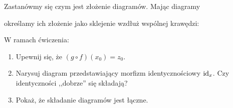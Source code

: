 \begin{exc}
{  Zastanówmy się czym jest złożenie diagramów. Mając diagramy
  \begin{center}
  \end{center}
  określamy ich złożenie jako sklejenie wzdłuż wspólnej krawędzi:
  \begin{center}
  \end{center}
  W ramach ćwiczenia:
  \begin{enumerate}
    \item Upewnij się, że $(g\circ f)(x_0) = z_0$.
    \item Narysuj diagram przedstawiający morfizm identycznościowy $\mathrm{id}_{x}$. Czy identyczności ,,dobrze'' się składają?
    \item Pokaż, że składanie diagramów jest łączne.
  \end{enumerate}
  }
\end{exc}

